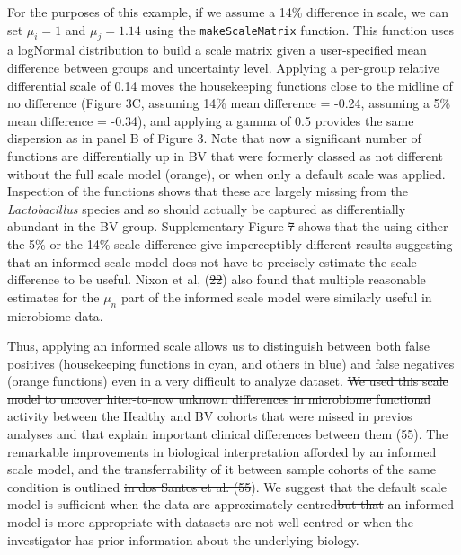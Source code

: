 \documentclass[
]{article}
\providecommand{\DIFadd}[1]{{\protect\color{blue}\uwave{#1}}} %
\providecommand{\DIFdel}[1]{{\protect\color{red}\sout{#1}}}                      %
\providecommand{\DIFaddbegin}{} %
\providecommand{\DIFaddend}{} %
\providecommand{\DIFdelbegin}{} %
\providecommand{\DIFdelend}{} %
\newcommand{\DIFscaledelfig}{0.5}
\newlength{\DIFdelgraphicswidth} %
\newlength{\DIFdelgraphicsheight} %
\newcommand{\DIFaddincludegraphics}[2][]{{\color{blue}\fbox{\DIFOincludegraphics[#1]{#2}}}} %
\newcommand{\DIFdelincludegraphics}[2][]{%
\sbox{\DIFdelgraphicsbox}{\DIFOincludegraphics[#1]{#2}}%
\settoboxwidth{\DIFdelgraphicswidth}{\DIFdelgraphicsbox} %
\settoboxtotalheight{\DIFdelgraphicsheight}{\DIFdelgraphicsbox} %
\scalebox{\DIFscaledelfig}{%
\parbox[b]{\DIFdelgraphicswidth}{\usebox{\DIFdelgraphicsbox}\\[-\baselineskip] \rule{\DIFdelgraphicswidth}{0em}}\llap{\resizebox{\DIFdelgraphicswidth}{\DIFdelgraphicsheight}{%
\setlength{\unitlength}{\DIFdelgraphicswidth}%
\begin{picture}(1,1)%
\thicklines\linethickness{2pt} %
{\color[rgb]{1,0,0}\put(0,0){\framebox(1,1){}}}%
{\color[rgb]{1,0,0}\put(0,0){\line( 1,1){1}}}%
{\color[rgb]{1,0,0}\put(0,1){\line(1,-1){1}}}%
\end{picture}%
}\hspace*{3pt}}} %
} %
\DeclareRobustCommand{\DIFaddbegin}{\DIFOaddbegin \let\includegraphics\DIFaddincludegraphics} %
\DeclareRobustCommand{\DIFaddend}{\DIFOaddend \let\includegraphics\DIFOincludegraphics} %
\DeclareRobustCommand{\DIFdelbegin}{\DIFOdelbegin \let\includegraphics\DIFdelincludegraphics} %
\DeclareRobustCommand{\DIFdelend}{\DIFOaddend \let\includegraphics\DIFOincludegraphics} %
\begin{document}
For the purposes of this example, if we assume a 14\% difference in
scale, we can set \(\mu_i = 1\) and \(\mu_j = 1.14\) using the
\texttt{makeScaleMatrix} function. This function uses a logNormal
distribution to build a scale matrix given a user-specified mean
difference between groups and uncertainty level. Applying a per-group
relative differential scale of 0.14 moves the housekeeping functions
close to the midline of no difference (Figure 3C, assuming 14\% mean
difference = -0.24, assuming a 5\% mean difference = -0.34), and
applying a gamma of 0.5 provides the same dispersion as in panel B of
Figure 3. Note that now a significant number of functions are
differentially up in BV that were formerly classed as not different
without the full scale model (orange), or when only a default scale was
applied. Inspection of the functions shows that these are largely
missing from the \emph{Lactobacillus} species and so should actually be
captured as differentially abundant in the BV group. Supplementary
Figure \DIFdelbegin \DIFdel{7 }\DIFdelend \DIFaddbegin \DIFadd{4 }\DIFaddend shows that the using either the 5\% or the 14\% scale
difference give imperceptibly different results suggesting that an
informed scale model does not have to precisely estimate the scale
difference to be useful. Nixon et al, (\DIFdelbegin \DIFdel{22}\DIFdelend \DIFaddbegin \DIFadd{20}\DIFaddend ) also found that multiple
reasonable estimates for the \(\mu_n\) part of the informed scale model
were similarly useful in microbiome data.

Thus, applying an informed scale allows us to distinguish between both
false positives (housekeeping functions in cyan, and others in blue) and
false negatives (orange functions) even in a very difficult to analyze
dataset. \DIFdelbegin \DIFdel{We used this scale model to uncover hiter-to-now unknown
differences in microbiome functional activity between the Healthy and BV
cohorts that were missed in previos analyses and that explain important
clinical differences between them (55). }\DIFdelend The remarkable improvements in biological interpretation
afforded by an informed scale model, and the transferrability of it
between sample cohorts of the same condition is outlined \DIFdelbegin \DIFdel{in dos Santos et al. (55}\DIFdelend \DIFaddbegin \DIFadd{elsewhere (50}\DIFaddend ).
We suggest that the default scale model is sufficient when the data are
approximately centred\DIFdelbegin \DIFdel{but that }\DIFdelend \DIFaddbegin \DIFadd{. However, }\DIFaddend an informed model is more appropriate
with datasets are not well centred or when the investigator has prior
information about the underlying biology.
\end{document}
